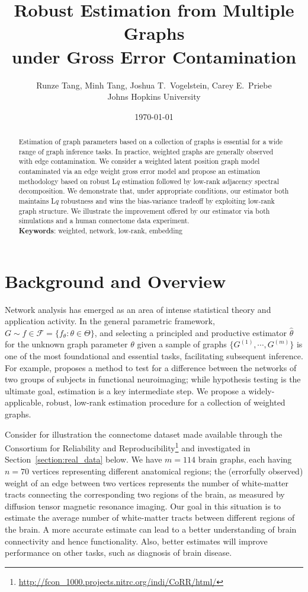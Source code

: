\documentclass[a4paper]{article}
\title{Robust Estimation from Multiple Graphs\\under Gross Error Contamination}
\author{Runze Tang, Minh Tang, Joshua T.\ Vogelstein, Carey E.\ Priebe\\Johns Hopkins University}
\date{\today}
\renewcommand{\hat}{\widehat}
\begin{document}
\maketitle

\begin{abstract}
Estimation of graph parameters based on a collection of graphs %
is essential for a wide range of graph inference tasks. In practice, weighted graphs are generally observed with edge contamination. We consider a weighted latent position graph model contaminated via an edge weight gross error model and propose an estimation methodology based on robust L$q$ estimation followed by low-rank adjacency spectral decomposition. We demonstrate that, under appropriate conditions, our estimator both maintains L$q$ robustness and wins the bias-variance tradeoff by exploiting low-rank graph structure. We illustrate the improvement offered by our estimator via both simulations and a human connectome data experiment. \\
{\bf Keywords}: weighted, network, low-rank, embedding
\end{abstract}


\section{Background and Overview}

Network analysis has emerged as an area of intense statistical theory and application activity. In the general parametric framework, $G \sim f \in \mathcal{F} = \{f_{\theta} : \theta \in \Theta \}$, and selecting a principled and productive estimator $\hat{\theta}$ for the unknown graph parameter $\theta$ given a sample of graphs $\{G^{(1)}, \cdots, G^{(m)}\}$ is one of the most foundational and essential tasks, facilitating subsequent inference.
For example, \citet{ginestet2014hypothesis} proposes a method to test for a difference between the networks of two groups of subjects in functional neuroimaging; while hypothesis testing is the ultimate goal, estimation is a key intermediate step.
We propose a widely-applicable, robust, low-rank estimation procedure for a collection of weighted graphs.

Consider for illustration the connectome dataset made available through the
Consortium for Reliability and Reproducibility\footnote{\url{http://fcon_1000.projects.nitrc.org/indi/CoRR/html/}}
and investigated in Section~\ref{section:real_data} below.
We have $m=114$ brain graphs, each having $n=70$ vertices representing different anatomical regions; the (errorfully observed) weight of an edge between two vertices represents the number of white-matter tracts connecting the corresponding two regions of the brain, as measured by
diffusion tensor magnetic resonance imaging.
Our goal in this situation is to estimate the average number of white-matter tracts between different regions of the brain. A more accurate estimate can lead to a better understanding of brain connectivity and hence functionality. Also, better estimates will improve performance on other tasks, such as diagnosis of brain disease. %
\end{document}

